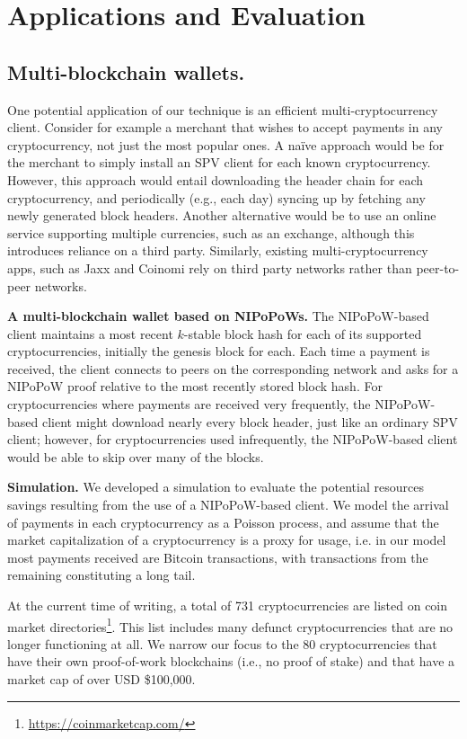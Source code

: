 \section{Applications and Evaluation}
\label{sec.applications}

\subsection{Multi-blockchain wallets.}
\label{sec.multichain}
One potential application of our technique is an efficient multi-cryptocurrency
client. Consider for example a merchant that wishes to accept payments in any
cryptocurrency, not just the most popular ones. A na\"ive approach would be for
the merchant to simply install an SPV client for each known cryptocurrency.
However, this approach would entail downloading the header chain for each
cryptocurrency, and periodically (e.g., each day) syncing up by fetching any
newly generated block headers. Another alternative would be to use an online
service supporting multiple currencies, such as an exchange, although this
introduces reliance on a third party. Similarly, existing multi-cryptocurrency
apps, such as Jaxx and Coinomi rely on third party networks rather than
peer-to-peer networks.

\textbf{A multi-blockchain wallet based on NIPoPoWs.}
The NIPoPoW-based client maintains a most recent $k$-stable block hash for each
of its supported cryptocurrencies, initially the genesis block for each. Each
time a payment is received, the client connects to peers on the corresponding
network and asks for a NIPoPoW proof relative to the most recently stored block
hash. For cryptocurrencies where payments are received very frequently, the
NIPoPoW-based client might download nearly every block header, just like an
ordinary SPV client; however, for cryptocurrencies used infrequently, the
NIPoPoW-based client would be able to skip over many of the blocks.

\textbf{Simulation.}
We developed a simulation to evaluate the potential resources savings resulting
from the use of a NIPoPoW-based client. We model the arrival of payments in
each cryptocurrency as a Poisson process, and assume that the market
capitalization of a cryptocurrency is a proxy for usage, i.e. in our model most
payments received are Bitcoin transactions, with transactions from the
remaining constituting a long tail.

At the current time of writing, a total of 731 cryptocurrencies are listed on
coin market directories\footnote{\url{https://coinmarketcap.com/}}. This list
includes many defunct cryptocurrencies that are no longer functioning at all.
We narrow our focus to the 80 cryptocurrencies that have their own
proof-of-work blockchains
(i.e., no proof of stake) and that have a market cap of over USD \$100,000.

